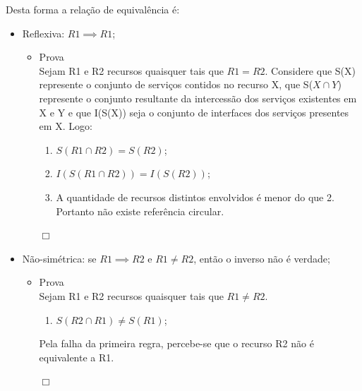 Desta forma a relação de equivalência é:

\begin{itemize}
	\item Reflexiva: $R1 \implies R1$;

	\begin{itemize}
		\item Prova \\

		Sejam R1 e R2 recursos quaisquer tais que $R1 = R2$. Considere que S(X) represente o conjunto de serviços contidos no recurso X, que S($X \cap Y$) represente o conjunto resultante da intercessão dos serviços existentes em X e Y e que I(S(X)) seja o conjunto de interfaces dos serviços presentes em X. Logo: \\
		
		\begin{enumerate}
			
			\item $S(R1 \cap R2) = S(R2)$; \\
			\item $I(S(R1 \cap R2)) = I(S(R2))$; \\
			\item A quantidade de recursos distintos envolvidos é menor do que 2. Portanto não existe referência circular.
		\end{enumerate}
		\begin{flushright}$\Box$\end{flushright}
	\end{itemize}
	
	\item Não-simétrica: se $R1 \implies R2$ e $R1 \neq R2$, então o inverso não é verdade;

	\begin{itemize}
		\item Prova \\

		Sejam R1 e R2 recursos quaisquer tais que $R1 \neq R2$. \\

		\begin{enumerate}
			\item $S(R2 \cap R1) \neq S(R1)$; \\
		\end{enumerate}

		Pela falha da primeira regra, percebe-se que o recurso R2 não é equivalente a R1.
		\begin{flushright}$\Box$\end{flushright}
	\end{itemize}


\end{itemize}
